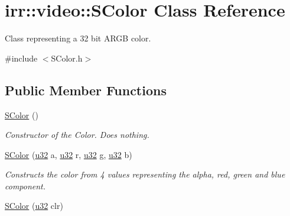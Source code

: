 \hypertarget{classirr_1_1video_1_1SColor}{}\section{irr\+:\+:video\+:\+:S\+Color Class Reference}
\label{classirr_1_1video_1_1SColor}


Class representing a 32 bit A\+R\+GB color.  




{\ttfamily \#include $<$S\+Color.\+h$>$}

\subsection*{Public Member Functions}
\begin{DoxyCompactItemize}
\item 
\hyperlink{classirr_1_1video_1_1SColor_ab001c0c2515ff5f8a0b324d1345485f4}{S\+Color} ()
\begin{DoxyCompactList}\small\item\em Constructor of the Color. Does nothing. \end{DoxyCompactList}\item 
\hyperlink{classirr_1_1video_1_1SColor_aa2ca1fcb9b11375282bb407b635b3dd6}{S\+Color} (\hyperlink{namespaceirr_a0416a53257075833e7002efd0a18e804}{u32} a, \hyperlink{namespaceirr_a0416a53257075833e7002efd0a18e804}{u32} r, \hyperlink{namespaceirr_a0416a53257075833e7002efd0a18e804}{u32} g, \hyperlink{namespaceirr_a0416a53257075833e7002efd0a18e804}{u32} b)
\begin{DoxyCompactList}\small\item\em Constructs the color from 4 values representing the alpha, red, green and blue component. \end{DoxyCompactList}\item 
\hyperlink{classirr_1_1video_1_1SColor_a56dd5677c3e36d3b33d5d796be2597da}{S\+Color} (\hyperlink{namespaceirr_a0416a53257075833e7002efd0a18e804}{u32} clr)\hypertarget{classirr_1_1video_1_1SColor_a56dd5677c3e36d3b33d5d796be2597da}{}\label{classirr_1_1video_1_1SColor_a56dd5677c3e36d3b33d5d796be2597da}


\end{DoxyCompactItemize}
